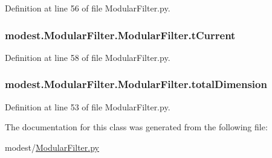 Definition at line 56 of file Modular\+Filter.\+py.

\subsubsection[{\texorpdfstring{t\+Current}{tCurrent}}]{\setlength{\rightskip}{0pt plus 5cm}modest.\+Modular\+Filter.\+Modular\+Filter.\+t\+Current}\hypertarget{classmodest_1_1ModularFilter_1_1ModularFilter_aa084950b3ec64691d1cb1136729032b5}{}\label{classmodest_1_1ModularFilter_1_1ModularFilter_aa084950b3ec64691d1cb1136729032b5}


Definition at line 58 of file Modular\+Filter.\+py.

\subsubsection[{\texorpdfstring{total\+Dimension}{totalDimension}}]{\setlength{\rightskip}{0pt plus 5cm}modest.\+Modular\+Filter.\+Modular\+Filter.\+total\+Dimension}\hypertarget{classmodest_1_1ModularFilter_1_1ModularFilter_a64f808a716a429e6767ef4b6990e8bb7}{}\label{classmodest_1_1ModularFilter_1_1ModularFilter_a64f808a716a429e6767ef4b6990e8bb7}


Definition at line 53 of file Modular\+Filter.\+py.



The documentation for this class was generated from the following file\+:\begin{DoxyCompactItemize}
\item 
modest/\hyperlink{ModularFilter_8py}{Modular\+Filter.\+py}\end{DoxyCompactItemize}
